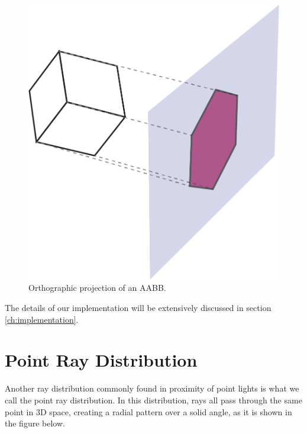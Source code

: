 \documentclass{PoliMi_MasterThesis}
\begin{document}
\begin{figure}[H]
    \centering
    \includegraphics[width=\textwidth*\real{0.45}]{Images/ortho_projection.png}
    \caption{Orthographic projection of an AABB.}
    \label{fig:aabb_ortho_projection}
\end{figure}

The details of our implementation will be extensively discussed in section \ref{ch:implementation}.

\section{Point Ray Distribution} \label{sec:point_ray_distribution}
Another ray distribution commonly found in proximity of point lights is what we call the point ray distribution. In this distribution, rays all pass through the same point in 3D space, creating a radial pattern over a solid angle, as it is shown in the figure below.
\end{document}
